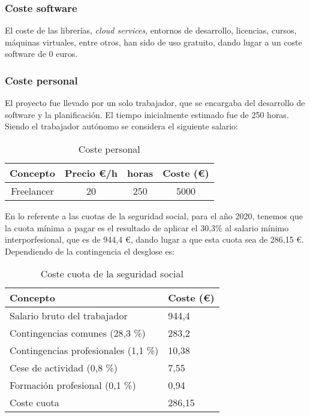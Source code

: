 \subsubsection{Coste software}
El coste de las librerías, \emph{cloud services}, entornos de desarrollo, licencias, cursos, máquinas virtuales, entre otros, han sido de uso gratuito, dando lugar a un coste software de 0 euros.

\subsubsection{Coste personal}
El proyecto fue llevado por un solo trabajador, que se encargaba del desarrollo de software y la planificación. El tiempo inicialmente estimado fue de 250 horas. Siendo el trabajador autónomo se considera el siguiente salario:

\begin{table}[H]
	\begin{center}
		\begin{tabular}{cccc}
			\hline
			Concepto                        & Precio €/h	& horas		& Coste (€)  	\\ \hline
			Freelancer					    & 20      		& 250		& 5000			\\ \hline
	
		\end{tabular}
		\caption{Coste personal}
		\label{table:costepersonal}
	\end{center}
\end{table}

En lo referente a las cuotas de la seguridad social, para el año 2020, tenemos que la cuota mínima a pagar es el resultado de aplicar el 30,3\% al salario mínimo interporfesional, que es de 944,4 €, dando lugar a que esta cuota sea de 286,15 €. Dependiendo de la contingencia el desglose es:

\begin{table}[H]
	\begin{center}
		\begin{tabular}{ll}
			\hline
			Concepto                        	& Coste (€) \\ \hline
			Salario bruto del trabajador    	& 944,4      \\
			Contingencias comunes (28,3 \%) 	& 283,2     \\
			Contingencias profesionales (1,1 \%) & 10,38     \\
			Cese de actividad (0,8 \%)          & 7,55        \\
			Formación profesional (0,1 \%)  & 0,94       \\ \hline
			Coste cuota				            & 286,15 
		\end{tabular}
	\caption{Coste cuota de la seguridad social}
	\label{table:costecuota}
	\end{center}
\end{table}

